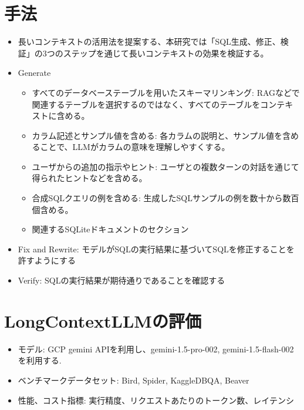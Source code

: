 \documentclass[dvipdfmx,uplatex]{jsarticle}
\theoremstyle{remark}
\newenvironment{method}[1]{
    \begin{tcolorbox}[
        colframe=green!50!black,
        colback=green!50!black!10!white,
        colbacktitle=green!50!black!40!white,
        coltitle=black,
        fonttitle=\bfseries,
        title={#1}
    ]
}{
    \end{tcolorbox}
}
\newenvironment{experiment}[1]{
    \begin{tcolorbox}[
        colframe=violet,
        colback=violet!10!white,
        colbacktitle=violet!40!white,
        coltitle=black,
        fonttitle=\bfseries,
        title={#1}
    ]
}{
    \end{tcolorbox}
}
\begin{document}
\section{手法}
\begin{method}{Long Context Prompting}
\begin{itemize}
    \item 長いコンテキストの活用法を提案する、本研究では「SQL生成、修正、検証」の3つのステップを通じて長いコンテキストの効果を検証する。
    \item Generate
    \begin{itemize}
        \item すべてのデータベーステーブルを用いたスキーマリンキング: RAGなどで関連するテーブルを選択するのではなく、すべてのテーブルをコンテキストに含める。
        \item  カラム記述とサンプル値を含める: 各カラムの説明と、サンプル値を含めることで、LLMがカラムの意味を理解しやすくする。
        \item ユーザからの追加の指示やヒント: ユーザとの複数ターンの対話を通じて得られたヒントなどを含める。
        \item 合成SQLクエリの例を含める: 生成したSQLサンプルの例を数十から数百個含める。
        \item 関連するSQLiteドキュメントのセクション
    \end{itemize}
    \item Fix and Rewrite: モデルがSQLの実行結果に基づいてSQLを修正することを許すようにする
    \item Verify: SQLの実行結果が期待通りであることを確認する   
\end{itemize}
\end{method}

\section{LongContextLLMの評価}
\begin{experiment}{評価設定}
\begin{itemize}
    \item モデル: GCP gemini APIを利用し、gemini-1.5-pro-002, gemini-1.5-flash-002 を利用する.
    \item ベンチマークデータセット: Bird, Spider, KaggleDBQA, Beaver
    \item 性能、コスト指標: 実行精度、リクエストあたりのトークン数、レイテンシ
\end{itemize}
\end{experiment}
\end{document}
